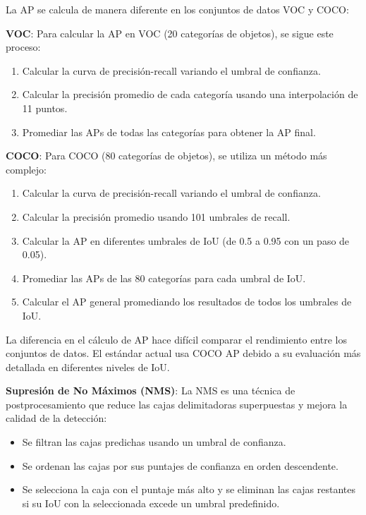 La AP se calcula de manera diferente en los conjuntos de datos VOC y COCO:

\textbf{VOC}: Para calcular la AP en VOC (20 categorías de objetos), se sigue este proceso:
\begin{enumerate}
    \item Calcular la curva de precisión-recall variando el umbral de confianza.
    \item Calcular la precisión promedio de cada categoría usando una interpolación de 11 puntos.
    \item Promediar las APs de todas las categorías para obtener la AP final.
\end{enumerate}

\textbf{COCO}: Para COCO (80 categorías de objetos), se utiliza un método más complejo:

\begin{enumerate}
    \item Calcular la curva de precisión-recall variando el umbral de confianza.
    \item Calcular la precisión promedio usando 101 umbrales de recall.
    \item Calcular la AP en diferentes umbrales de IoU (de 0.5 a 0.95 con un paso de 0.05).
    \item Promediar las APs de las 80 categorías para cada umbral de IoU.
    \item Calcular el AP general promediando los resultados de todos los umbrales de IoU.
\end{enumerate}

La diferencia en el cálculo de AP hace difícil comparar el rendimiento entre los conjuntos de datos. El estándar actual usa COCO AP debido a su evaluación más detallada en diferentes niveles de IoU.

\textbf{Supresión de No Máximos (NMS)}:
La NMS es una técnica de postprocesamiento que reduce las cajas delimitadoras superpuestas y mejora la calidad de la detección:

\begin{itemize}
    \item Se filtran las cajas predichas usando un umbral de confianza.
    \item Se ordenan las cajas por sus puntajes de confianza en orden descendente.
    \item Se selecciona la caja con el puntaje más alto y se eliminan las cajas restantes si su IoU con la seleccionada excede un umbral predefinido.
\end{itemize}

